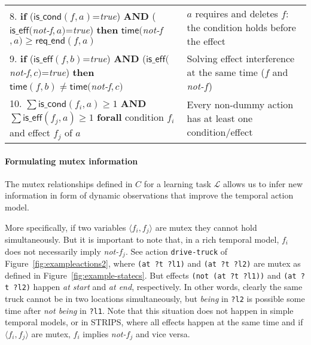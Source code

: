 \documentclass{ecai}
\newcommand{\tup}[1]{{\langle #1 \rangle}}
\newcommand{\iscond}{\mathsf{is\_cond}}    %
\newcommand{\iseff}{\mathsf{is\_eff}}    %
\newcommand{\tim}{\mathsf{time}}   %
\newcommand{\reqe}{\mathsf{req\_{end}}}   %
\begin{document}
\begin{table*}
\begin{center}
\begin{scriptsize}
\begin{tabular}{p{10.4cm}p{6.6cm}}
8. \textbf{if} ($\iscond(f,a)$=\textit{true}) \textbf{AND} ($\iseff($\textit{not-f}$,a)$=\textit{true}) \textbf{then} $\tim($\textit{not-f}$,a) \geq \reqe(f,a)$ & $a$ requires and deletes $f$: the condition holds before the effect \\ 

9. \textbf{if} ($\iseff(f,b)$=\textit{true}) \textbf{AND} ($\iseff($\textit{not-f}$,c)$=\textit{true}) \textbf{then} $\tim(f,b) \neq \tim($\textit{not-f}$,c)$ & Solving effect interference at the same time ($f$ and \textit{not-}$f$) \\

10. $\sum \iscond(f_i,a) \geq 1$ \textbf{AND} $\sum \iseff(f_j,a) \geq 1$ \textbf{forall} condition $f_i$ and effect $f_j$ of $a$ & Every non-dummy action has at least one condition/effect \\

\end{tabular}
\end{scriptsize}	
\label{table:constraints}
\end{center}	
\end{table*}


\paragraph{Formulating mutex information}

The mutex relationships defined in $C$ for a learning task $\mathcal{L}$ allows us to infer new information in form of dynamic observations that improve the temporal action model.

More specifically, if two variables $\tup{f_i, f_j}$ are mutex they cannot hold simultaneously. But it is important to note that, in a rich temporal model, $f_i$ does not necessarily imply \textit{not-}$f_j$.
See action \texttt{drive-truck} of Figure~\ref{fig:exampleactions2}, where \texttt{(at ?t ?l1)} and \texttt{(at ?t ?l2)} are mutex as defined in Figure~\ref{fig:example-statecs}. But effects \texttt{(not (at ?t ?l1))} and \texttt{(at ?t ?l2)} happen \textit{at start} and \textit{at end}, respectively. In other words, clearly the same truck cannot be in two locations simultaneously, but \textit{being} in \texttt{?l2} is possible some time after \textit{not being} in \texttt{?l1}. Note that this situation does not happen in simple temporal models, or in STRIPS, where all effects happen at the same time and if $\tup{f_i, f_j}$ are mutex, $f_i$ implies \textit{not-}$f_j$ and vice versa.
\end{document}
